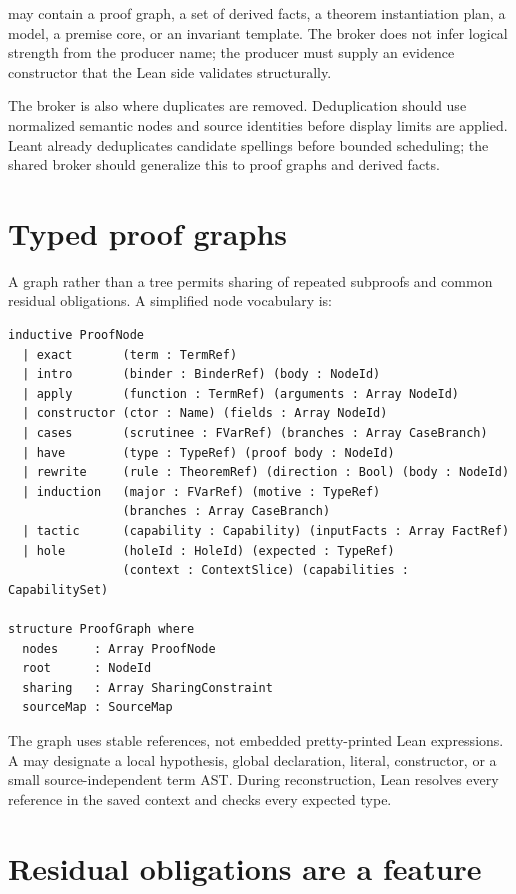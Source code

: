 \documentclass[11pt,letterpaper,openany]{report}
\newcommand{\code}[1]{\texttt{\detokenize{#1}}}
\begin{document}
\code{CandidatePayload} may contain a proof graph, a set of derived facts, a theorem
instantiation plan, a model, a premise core, or an invariant template. The broker does
not infer logical strength from the producer name; the producer must supply an
evidence constructor that the Lean side validates structurally.

The broker is also where duplicates are removed. Deduplication should use normalized
semantic nodes and source identities before display limits are applied. Leant already
deduplicates candidate spellings before bounded scheduling; the shared broker should
generalize this to proof graphs and derived facts.

\section{Typed proof graphs}

A graph rather than a tree permits sharing of repeated subproofs and common residual
obligations. A simplified node vocabulary is:

\begin{lstlisting}[language=LeanFour,caption={Schematic proof-graph vocabulary}]
inductive ProofNode
  | exact       (term : TermRef)
  | intro       (binder : BinderRef) (body : NodeId)
  | apply       (function : TermRef) (arguments : Array NodeId)
  | constructor (ctor : Name) (fields : Array NodeId)
  | cases       (scrutinee : FVarRef) (branches : Array CaseBranch)
  | have        (type : TypeRef) (proof body : NodeId)
  | rewrite     (rule : TheoremRef) (direction : Bool) (body : NodeId)
  | induction   (major : FVarRef) (motive : TypeRef)
                (branches : Array CaseBranch)
  | tactic      (capability : Capability) (inputFacts : Array FactRef)
  | hole        (holeId : HoleId) (expected : TypeRef)
                (context : ContextSlice) (capabilities : CapabilitySet)

structure ProofGraph where
  nodes     : Array ProofNode
  root      : NodeId
  sharing   : Array SharingConstraint
  sourceMap : SourceMap
\end{lstlisting}

The graph uses stable references, not embedded pretty-printed Lean expressions. A
\code{TermRef} may designate a local hypothesis, global declaration, literal,
constructor, or a small source-independent term AST. During reconstruction, Lean
resolves every reference in the saved context and checks every expected type.

\section{Residual obligations are a feature}
\end{document}
